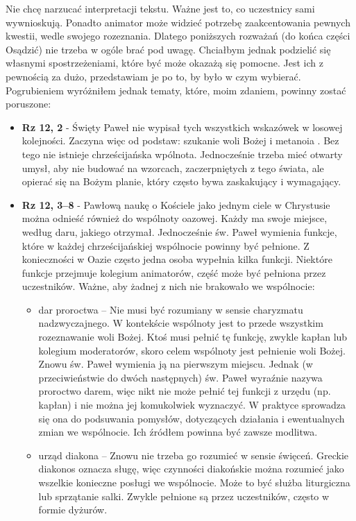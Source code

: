 \documentclass[a5paper,10pt,polish]{book}
\begin{document}
Nie chcę narzucać interpretacji tekstu. Ważne jest to, co uczestnicy sami wywnioskują. Ponadto animator może widzieć potrzebę zaakcentowania pewnych kwestii, wedle swojego rozeznania. Dlatego poniższych rozważań (do końca części Osądzić) nie trzeba w ogóle brać pod uwagę. Chciałbym jednak podzielić  się własnymi spostrzeżeniami, które być może okazażą się pomocne. Jest ich z pewnością za dużo, przedstawiam  je po to, by było w czym wybierać. Pogrubieniem wyróżniłem jednak tematy, które, moim zdaniem, powinny zostać poruszone:
\begin{itemize}
\item {} 
\textbf{Rz 12, 2} - Święty Paweł nie wypisał  tych  wszystkich wskazówek w losowej kolejności. Zaczyna więc od podstaw: szukanie woli Bożej i metanoia . Bez tego nie istnieje chrześcijańska wpólnota.  Jednocześnie trzeba mieć otwarty umysł, aby nie budować na wzorcach, zaczerpniętych z tego świata, ale opierać się na Bożym planie, który często bywa zaskakujący i wymagający.

\item {} 
\textbf{Rz 12, 3–8} - Pawłową naukę o Kościele jako jednym ciele w Chrystusie  można odnieść również do wspólnoty  oazowej. Każdy ma swoje miejsce, według  daru, jakiego otrzymał. Jednocześnie św. Paweł wymienia funkcje, które w każdej chrześcijańskiej wspólnocie powinny być pełnione. Z konieczności w Oazie często jedna osoba wypełnia kilka funkcji. Niektóre  funkcje przejmuje kolegium animatorów, część może  być pełniona przez uczestników. Ważne, aby żadnej z nich nie brakowało  we wspólnocie:
\begin{itemize}
\item {} 
dar proroctwa – Nie musi być rozumiany w sensie charyzmatu nadzwyczajnego. W kontekście wspólnoty jest to przede wszystkim rozeznawanie woli Bożej. Ktoś musi pełnić tę funkcję, zwykle kapłan lub kolegium moderatorów, skoro celem wspólnoty  jest pełnienie woli Bożej. Znowu św. Paweł wymienia ją na pierwszym miejscu. Jednak (w przeciwieństwie do dwóch następnych) św. Paweł wyraźnie nazywa proroctwo darem, więc nikt nie może pełnić tej funkcji z urzędu (np. kapłan) i nie można jej komukolwiek wyznaczyć. W praktyce sprowadza się ona do podsuwania pomysłów, dotyczących działania i ewentualnych zmian we wspólnocie. Ich źródłem powinna być zawsze modlitwa.

\item {} 
urząd diakona – Znowu nie trzeba go rozumieć w sensie święceń. Greckie diakonos oznacza sługę, więc czynności diakońskie można rozumieć jako wszelkie konieczne posługi we wspólnocie. Może to być służba liturgiczna lub sprzątanie salki. Zwykle pełnione są przez uczestników, często w formie dyżurów.


\end{itemize}
\end{itemize}
\end{document}
